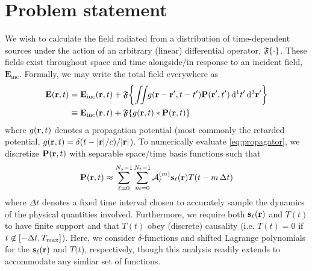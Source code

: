 \section{Problem statement}

We wish to calculate the field radiated from a distribution of time-dependent sources under the action of an arbitrary (linear) differential operator, $\mathfrak{F}\qty{\cdot}$.
These fields exist throughout space and time alongside/in response to an incident field, $\mathbf{E}_\text{inc}$.
Formally, we may write the total field everywhere as
\begin{equation}
  \begin{aligned}
    \vb{E}(\vb{r}, t) & = \vb{E}_\text{inc}(\vb{r}, t) + \mathfrak{F}\qty{\iint_{} \kern0.1emg(\vb{r} - \vb{r}', t - t') \vb{P}(\vb{r}', t') \dd[1]{t'} \dd[3]{\vb{r}'}} \\
                      & \equiv \vb{E}_\text{inc}(\vb{r}, t) + \mathfrak{F}\qty{g(\vb{r}, t) \ast \vb{P}(\vb{r}, t)}
    \end{aligned}
  \label{eq:propagator}
\end{equation}
where $g(\vb{r}, t)$ denotes a propagation potential (most commonly the retarded potential, $g(\vb{r}, t) = \delta(t - \abs{\vb{r}}/c)/\abs{\vb{r}}$).
To numerically evaluate \cref{eq:propagator}, we discretize $\vb{P}(\vb{r}, t)$ with separable space/time basis functions such that 
\begin{equation}
  \vb{P}(\vb{r}, t) \approx \sum_{\ell = 0}^{N_s - 1} \sum_{m = 0}^{N_t - 1} \mathcal{A}_\ell^{(m)} \vb{s}_\ell(\vb{r}) T(t - m \, \Delta t)
  \label{eq:discretization}
\end{equation}
where $\Delta t$ denotes a fixed time interval chosen to accurately sample the dynamics of the physical quantities involved.
Furthermore, we require both $\vb{s}_\ell(\vb{r})$ and $T(t)$ to have finite support and that $T(t)$ obey (discrete) causality (i.e. $T(t) = 0$ if $t \not \in \qty[-\Delta t, T_\text{max}]$).
Here, we consider $\delta$-functions and shifted Lagrange polynomials for the $\vb{s}_\ell(\vb{r})$ and $T(t$), respectively, though this analysis readily extends to accommodate any simliar set of functions.

